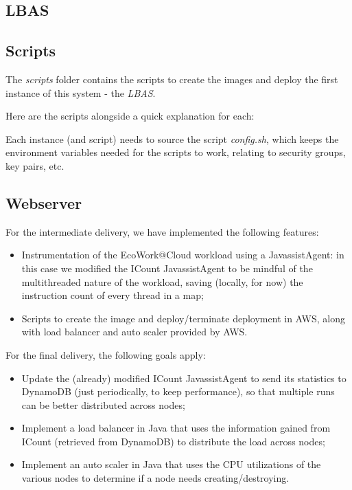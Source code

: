 \documentclass{article}
\begin{document}
\subsection{LBAS}


\subsection{Scripts}

The \textit{scripts} folder contains the scripts to create the images and deploy
the first instance of this system - the \textit{LBAS}.

Here are the scripts alongside a quick explanation for each:


Each instance (and script) needs to source the script \textit{config.sh}, which
keeps the environment variables needed for the scripts to work, relating to
security groups, key pairs, etc.

\subsection{Webserver}

For the intermediate delivery, we have implemented the following features:
\begin{itemize}
    \item Instrumentation of the EcoWork@Cloud workload using a JavassistAgent:
        in this case we modified the ICount JavassistAgent to be mindful of the
        multithreaded nature of the workload, saving (locally, for now) the
        instruction count of every thread in a map;
    \item Scripts to create the image and deploy/terminate deployment in AWS,
        along with load balancer and auto scaler provided by AWS.
\end{itemize}

For the final delivery, the following goals apply:
\begin{itemize}
    \item Update the (already) modified ICount JavassistAgent to send its
        statistics to DynamoDB (just periodically, to keep performance), so that
        multiple runs can be better distributed across nodes;
    \item Implement a load balancer in Java that uses the information gained
        from ICount (retrieved from DynamoDB) to distribute the load across
        nodes;
    \item Implement an auto scaler in Java that uses the CPU utilizations of the
        various nodes to determine if a node needs creating/destroying.
\end{itemize}
\end{document}
